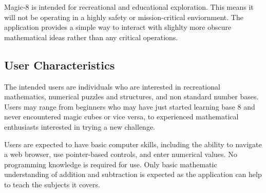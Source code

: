 \documentclass[12pt]{article}
\begin{document}


Magic-8 is intended for recreational and educational exploration. This means it will
not be operating in a highly safety or mission-critical enviornment. The application
provides a simple way to interact with slighlty more obscure mathematical ideas rather
than any critical operations.

\subsection{User Characteristics} \label{SecUserCharacteristics}


The intended users are individuals who are interested in recreational mathematics,
numerical puzzles and structures, and non standard number bases. Users may range from
beginners who may have just started learning base 8 and never encountered magic cubes
or vice versa, to experienced mathematical enthusiasts interested in trying a new challenge.

Users are expected to have basic computer skills, including the ability to navigate a web browser,
use pointer-based controls, and enter numerical values. No programming knowledge is required for use.
Only basic mathematic understanding of addition and subtraction is expected as the application can help 
to teach the subjects it covers.
\end{document}

